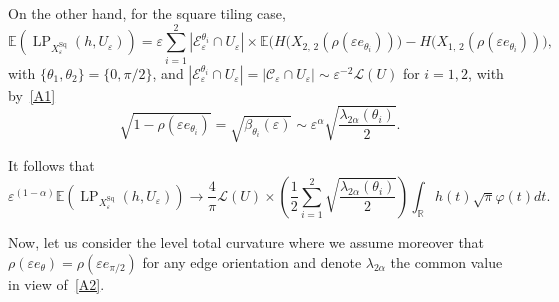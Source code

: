 \documentclass[AHL,Unicode,longabstracts,published]{cedram}
\newcommand{\R}{\mathbb{R}}
\newcommand{\E}{\mathbb{E}}
\newcommand{\eps}{\varepsilon}
\DeclareMathOperator{\LP}{LP}
\DeclareMathOperator{\Sq}{Sq}
\newcommand{\calL}{\mathcal{L}}
\newcommand{\calC}{\mathcal{C}}
\newcommand{\calE}{\mathcal{E}}
\begin{document}
On the other hand, for the square tiling case,
\[
\E\left(\LP_{X_\eps^{\Sq}}(h,U_\eps)\right)=\eps\sum_{i=1}^2|\calE_\eps^{\theta_i}\cap U_\eps|\times
\E\big(H(X_{2,\,2}(\rho(\eps e_{\theta_i}))\big) - H\big(X_{1,\,2}(\rho(\eps e_{\theta_i}))\big),
\]
with $\{\theta_1,\theta_2\}=\{0,\pi/2\}$, and $|\calE_\eps^{\theta_i}\cap U_\eps|=|\calC_\eps\cap U_\eps|\sim \eps^{-2}{\calL}(U)$ for $i=1,2$, with by~\eqref{A1}
\[
\sqrt{1-\rho(\eps e_{\theta_i})}=\sqrt{\beta_{\theta_i}(\eps)}\sim \eps^\alpha\sqrt{\frac{\lambda_{{2\alpha}}(\theta_i)}{2}}.
\]

It follows that
\[
\eps^{(1-\alpha)}\E\left(\LP_{X_\eps^{\Sq}}(h,U_\eps)\right)\longrightarrow \frac{4}{{\pi}}{\calL}(U)
\times\left(\frac{1}{2}\sum_{i=1}^2\sqrt{\frac{\lambda_{{2\alpha}}(\theta_i)}{2}}\right)\int_\R h(t){\sqrt{\pi}}\varphi(t)dt.
\]



Now, let us consider the level total curvature where we assume moreover that $\rho(\eps e_\theta)=\rho(\eps e_{\pi/2})$ for any edge orientation and denote $\lambda_{{2\alpha}}$ the common value in view of~\eqref{A2}.
\end{document}
